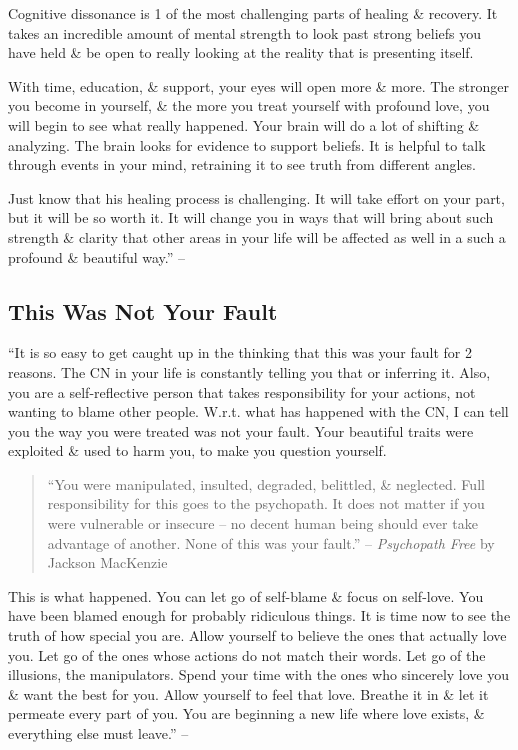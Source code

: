 \documentclass{article}
\numberwithin{equation}{section}
\begin{document}
Cognitive dissonance is 1 of the most challenging parts of healing \& recovery. It takes an incredible amount of mental strength to look past strong beliefs you have held \& be open to really looking at the reality that is presenting itself.

With time, education, \& support, your eyes will open more \& more. The stronger you become in yourself, \& the more you treat yourself with profound love, you will begin to see what really happened. Your brain will do a lot of shifting \& analyzing. The brain looks for evidence to support beliefs. It is helpful to talk through events in your mind, retraining it to see truth from different angles.

Just know that his healing process is challenging. It will take effort on your part, but it will be so worth it. It will change you in ways that will bring about such strength \& clarity that other areas in your life will be affected as well in a such a profound \& beautiful way.'' -- \cite[pp. 152--153]{Mirza2017}

\subsection{This Was Not Your Fault}
``It is so easy to get caught up in the thinking that this was your fault for 2 reasons. The CN in your life is constantly telling you that or inferring it. Also, you are a self-reflective person that takes responsibility for your actions, not wanting to blame other people. W.r.t. what has happened with the CN, I can tell you the way you were treated was not your fault. Your beautiful traits were exploited \& used to harm you, to make you question yourself.
\begin{quotation}
	``You were manipulated, insulted, degraded, belittled, \& neglected. Full responsibility for this goes to the psychopath. It does not matter if you were vulnerable or insecure -- no decent human being should ever take advantage of another. None of this was your fault.'' -- \textit{Psychopath Free} by Jackson MacKenzie
\end{quotation}
This is what happened. You can let go of self-blame \& focus on self-love. You have been blamed enough for probably ridiculous things. It is time now to see the truth of how special you are. Allow yourself to believe the ones that actually love you. Let go of the ones whose actions do not match their words. Let go of the illusions, the manipulators. Spend your time with the ones who sincerely love you \& want the best for you. Allow yourself to feel that love. Breathe it in \& let it permeate every part of you. You are beginning a new life where love exists, \& everything else must leave.'' -- \cite[pp. 153--154]{Mirza2017}
\end{document}
